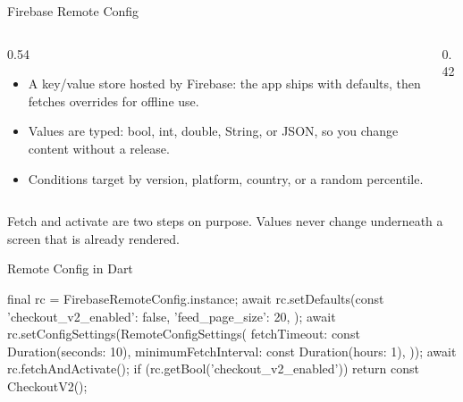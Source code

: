 \documentclass[10pt,aspectratio=169,t]{beamer}
\begin{document}
\begin{frame}[eyebrow=Feature flags]{Firebase Remote Config}
  \begin{columns}[T]
    \begin{column}{0.54\textwidth}
      \begin{itemize}
        \item A key/value store hosted by Firebase: the app ships with defaults, then fetches overrides for offline use.
        \item Values are typed: bool, int, double, String, or JSON, so you change content without a release.
        \item Conditions target by version, platform, country, or a random percentile.
      \end{itemize}
    \end{column}
    \begin{column}{0.42\textwidth}
    \end{column}
  \end{columns}
  \begin{takeaway}{Fetch and activate are two steps on purpose.}
    Values never change underneath a screen that is already rendered.
  \end{takeaway}
\end{frame}

\begin{frame}[fragile,eyebrow=Feature flags]{Remote Config in Dart}
\begin{dart}
final rc = FirebaseRemoteConfig.instance;
await rc.setDefaults(const {
  'checkout_v2_enabled': false,
  'feed_page_size': 20,
});
await rc.setConfigSettings(RemoteConfigSettings(
  fetchTimeout: const Duration(seconds: 10),
  minimumFetchInterval: const Duration(hours: 1),
));
await rc.fetchAndActivate();
if (rc.getBool('checkout_v2_enabled')) return const CheckoutV2();
\end{dart}
\end{frame}
\end{document}
